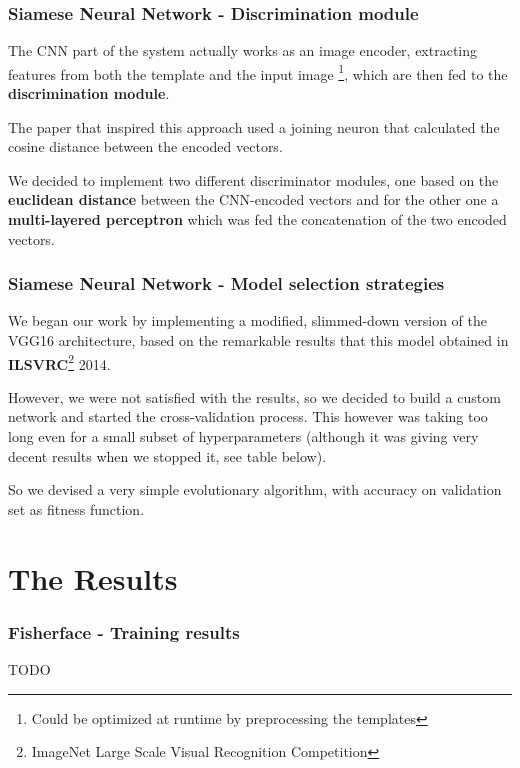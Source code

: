 \documentclass{beamer}
\begin{document}
	\begin{frame}
		\frametitle{Siamese Neural Network - Discrimination module}
		The CNN part of the system actually works as an image encoder, extracting features from both the template and the input image \footnote{Could be optimized at runtime by preprocessing the templates},
		which are then fed to the \textbf{discrimination module}.
		
		The paper that inspired this approach used a joining neuron that calculated the cosine distance between the encoded vectors.
		
		We decided to implement two different discriminator modules, one based on the \textbf{euclidean distance} between the CNN-encoded vectors and for the other one a \textbf{multi-layered perceptron} which was fed the concatenation of the two encoded vectors.
	\end{frame}	
	
	\begin{frame}
		\frametitle{Siamese Neural Network - Model selection strategies}
		We began our work by implementing a modified, slimmed-down version of the VGG16 architecture, based on the remarkable results that this model obtained in \textbf{ILSVRC}\footnote{ImageNet Large Scale Visual Recognition Competition} 2014.
	
		\bigskip
		
		However, we were not satisfied with the results, so we decided to build a custom network and started the cross-validation process. This however was taking too long even for a small subset of hyperparameters (although it was giving very decent results when we stopped it, see table below).
		
		\bigskip
		
		So we devised a very simple evolutionary algorithm, with accuracy on validation set as fitness function.
	\end{frame}
	
	\section{The Results}

	\begin{frame}
		\frametitle{Fisherface - Training results}
		TODO	
	\end{frame}
	
\end{document}
